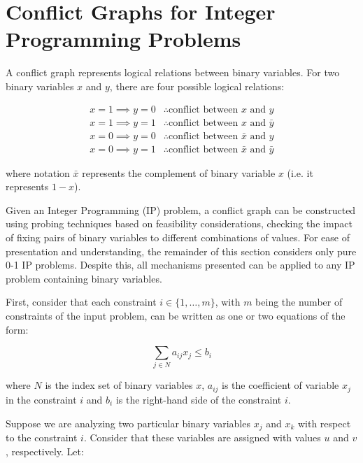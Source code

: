 \documentclass[preprint,12pt]{elsarticle}
\begin{document}
\section{Conflict Graphs for Integer Programming Problems}\label{cgraph}

A conflict graph represents logical relations between binary variables. For two binary variables $x$ and $y$, there are four possible logical relations:

\begin{align}
x = 1 \implies y = 0 & \therefore \text{conflict between } x \text{ and } y\nonumber\\
x = 1 \implies y = 1 & \therefore \text{conflict between } x \text{ and } \bar{y}\nonumber\\
x = 0 \implies y = 0 & \therefore \text{conflict between } \bar{x} \text{ and } y\nonumber\\
x = 0 \implies y = 1 & \therefore \text{conflict between } \bar{x} \text{ and } \bar{y}\nonumber
\end{align}

\noindent where notation $\bar{x}$ represents the complement of binary variable $x$ (i.e. it represents $1 - x$).

Given an Integer Programming (IP) problem, a conflict graph can be constructed using probing techniques based on feasibility considerations, checking the impact of fixing pairs of binary variables to different combinations of values. For ease of presentation and understanding, the remainder of this section considers only pure 0-1 IP problems. Despite this, all mechanisms presented can be applied to any IP problem containing binary variables.

First, consider that each constraint $i \in \{1,\ldots,m\}$, with $m$ being the number of constraints of the input problem, can be written as one or two equations of the form:

\begin{equation}
 \sum_{j \in N} a_{ij}x_{j} \leq b_i
\end{equation}

\noindent where $N$ is the index set of binary variables $x$, $a_{ij}$ is the coefficient of variable $x_{j}$ in the constraint $i$ and $b_i$ is the right-hand side of the constraint $i$.

Suppose we are analyzing two particular binary variables $x_j$ and $x_k$ with respect to the constraint $i$. Consider that these variables are assigned with values $u$ and $v$, respectively. Let:
\end{document}
